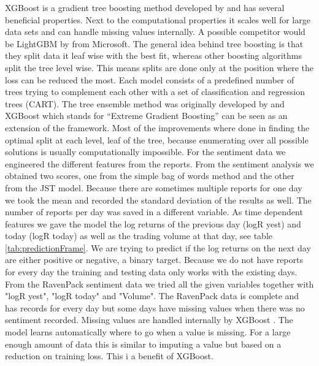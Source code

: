 XGBoost is a gradient tree boosting method developed by \citet{Chen_2016} and has several beneficial properties. Next to the computational properties it scales well for large data sets and can handle missing values internally. A possible competitor would be LightGBM by \citet{Ke2017LightGBMAH} from Microsoft. The general idea behind tree boosting is that they split data it leaf wise with the best fit, whereas other boosting algorithms split the tree level wise. This means splits are done only at the position where the loss can be reduced the most. Each model consists of a predefined number of trees trying to complement each other with a set of classification and regression trees (CART). The tree ensemble method was originally developed by \citet{friedman2001greedy} and XGBoost which stands for \enquote{Extreme Gradient Boosting} can be seen as an extension of the framework. Most of the improvements where done in finding the optimal split at each level, leaf of the tree, because enumerating over all possible solutions is usually computationally impossible. 
For the sentiment data we engineered the different features from the reports. From the sentiment analysis we obtained two scores, one from the simple bag of words method and the other from the JST model. Because there are sometimes multiple reports for one day we took the mean and recorded the standard deviation of the results as well. The number of reports per day was saved in a different variable. As time dependent features we gave the model the log returns of the previous day (logR yest) and today (logR today) as well as the trading volume at that day, see table \ref{tab:predictionFrame}. We are trying to predict if the log returns on the next day are either positive or negative, a binary target. Because we do not have reports for every day the training and testing data only works with the existing days.
From the RavenPack sentiment data we tried all the given variables together with "logR yest", "logR today" and "Volume". The RavenPack data is complete and has records for every day but some days have missing values when there was no sentiment recorded. Missing values are handled internally by XGBoost \citep{Chen_2016}. The model learns automatically where to go when a value is missing. For a large enough amount of data this is similar to imputing a value but based on a reduction on training loss. This i a benefit of XGBoost. 
